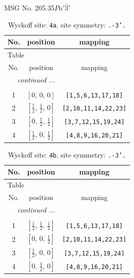 \documentclass[fleqn,8pt]{jsarticle}
\begin{document}
\setcounter{MaxMatrixCols}{32}

\renewcommand{\tablename}{Table~}
\renewcommand{\figurename}{Figure~}
\begin{center}
\LARGE
MSG No. 205.35\quad$Pa'\bar{3}'$
\end{center}
\renewcommand{\arraystretch}{1.2}
\begin{longtable}{ccc}
\caption{Wyckoff site: {\tt 4a}, site symmetry: {\tt .-3'.}}
 \\
 \hline \hline
No. & position & mapping \\ \hline \endfirsthead

\multicolumn{2}{l}{\tablename\ \thetable{}} \\
 \hline \hline
No. & position & mapping \\ \hline \endhead

 \hline \hline
\multicolumn{2}{r}{\footnotesize\it continued ...} \\ \endfoot

 \hline \hline
\multicolumn{2}{r}{} \\ \endlastfoot

1 & $\left[ 0,\, 0,\, 0 \right]$ & {\tt [1,5,6,13,17,18]} \\ \hline
2 & $\left[ \frac{1}{2},\, \frac{1}{2},\, 0 \right]$ & {\tt [2,10,11,14,22,23]} \\ \hline
3 & $\left[ 0,\, \frac{1}{2},\, \frac{1}{2} \right]$ & {\tt [3,7,12,15,19,24]} \\ \hline
4 & $\left[ \frac{1}{2},\, 0,\, \frac{1}{2} \right]$ & {\tt [4,8,9,16,20,21]} \\
\end{longtable}
\renewcommand{\arraystretch}{1.2}
\begin{longtable}{ccc}
\caption{Wyckoff site: {\tt 4b}, site symmetry: {\tt .-3'.}}
 \\
 \hline \hline
No. & position & mapping \\ \hline \endfirsthead

\multicolumn{2}{l}{\tablename\ \thetable{}} \\
 \hline \hline
No. & position & mapping \\ \hline \endhead

 \hline \hline
\multicolumn{2}{r}{\footnotesize\it continued ...} \\ \endfoot

 \hline \hline
\multicolumn{2}{r}{} \\ \endlastfoot

1 & $\left[ \frac{1}{2},\, \frac{1}{2},\, \frac{1}{2} \right]$ & {\tt [1,5,6,13,17,18]} \\ \hline
2 & $\left[ 0,\, 0,\, \frac{1}{2} \right]$ & {\tt [2,10,11,14,22,23]} \\ \hline
3 & $\left[ \frac{1}{2},\, 0,\, 0 \right]$ & {\tt [3,7,12,15,19,24]} \\ \hline
4 & $\left[ 0,\, \frac{1}{2},\, 0 \right]$ & {\tt [4,8,9,16,20,21]} \\
\end{longtable}
\end{document}
